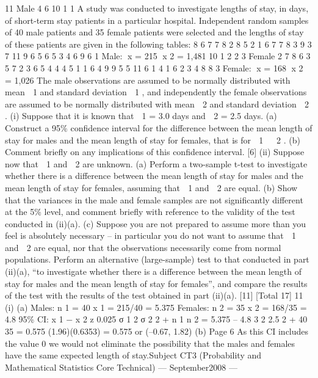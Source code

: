 \documentclass[a4paper,12pt]{article}
\begin{document}
\begin{enumerate}11
Male
4
6
10
1
1
A study was conducted to investigate lengths of stay, in days, of short-term stay
patients in a particular hospital. Independent random samples of 40 male patients and
35 female patients were selected and the lengths of stay of these patients are given in
the following tables:
8
6
7
7
8
2
8
5
2
1
6
7
7
8
3
9
3
7
11
9
6
5
6
5
3
4
6
9
6
1
Male: x = 215 x 2 = 1,481
10
1
2
2
3
Female
2
7
8
6
3
5
7
2
3
6
5
4
4
4
5
1
1
6
4
9
9
5
5
11
6
1
4
1
6
2
3
4
8
8
3
Female: x = 168 x 2 = 1,026
The male observations are assumed to be normally distributed with mean  1 and
standard deviation  1 , and independently the female observations are assumed to be
normally distributed with mean  2 and standard deviation  2 .
(i)
Suppose that it is known that  1 = 3.0 days and  2 = 2.5 days.
(a) Construct a 95\% confidence interval for the difference between the
mean length of stay for males and the mean length of stay for females,
that is for  1   2 .
(b) Comment briefly on any implications of this confidence interval.
[6]
(ii)
Suppose now that  1 and  2 are unknown.
(a) Perform a two-sample t-test to investigate whether there is a difference
between the mean length of stay for males and the mean length of stay
for females, assuming that  1 and  2 are equal.
(b) Show that the variances in the male and female samples are not
significantly different at the 5\% level, and comment briefly with
reference to the validity of the test conducted in (ii)(a).
(c) Suppose you are not prepared to assume more than you feel is
absolutely necessary – in particular you do not want to assume that
 1 and  2 are equal, nor that the observations necessarily come from
normal populations.
Perform an alternative (large-sample) test to that conducted in part
(ii)(a), “to investigate whether there is a difference between the mean
length of stay for males and the mean length of stay for females”, and
compare the results of the test with the results of the test obtained in
part (ii)(a).
[11]
[Total 17]
11
(i)
(a)
Males: n 1 = 40
x 1 = 215/40 = 5.375
Females: n 2 = 35 x 2 = 168/35 = 4.8
95\% CI:
x 1 − x 2 \pm z 0.025
σ 1 2 σ 2 2
+
n 1 n 2
= 5.375 – 4.8 
3 2 2.5 2
+
40 35
= 0.575 \pm (1.96)(0.6353)
= 0.575  or (–0.67, 1.82)
(b)
Page 6
As this CI includes the value 0 we would not eliminate the possibility
that the males and females have the same expected length of stay.Subject CT3 (Probability and Mathematical Statistics Core Technical) — September2008 — %

\end{enumerate}
\end{document}
